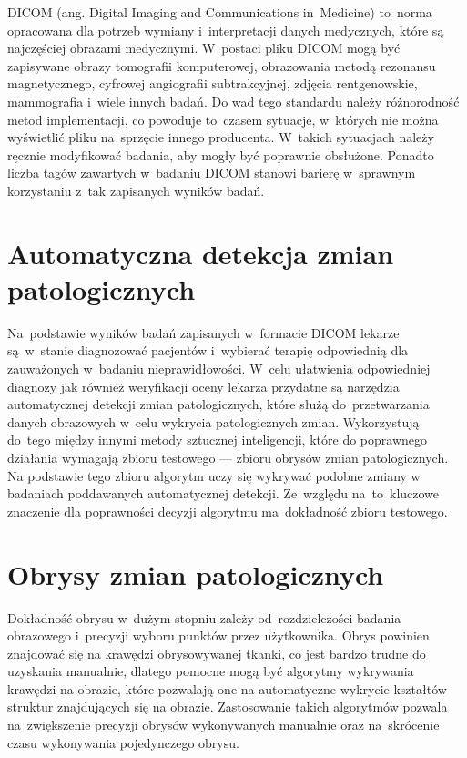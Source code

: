 \documentclass[a4paper,11pt,twoside,openright]{report}
\theoremstyle{definition}
\begin{document}
DICOM (ang. Digital Imaging and Communications in~Medicine) \cite{DICOM} to~norma
opracowana dla potrzeb wymiany i~interpretacji danych medycznych, które są
najczęściej obrazami medycznymi. W~postaci pliku DICOM mogą być zapisywane obrazy
tomografii komputerowej, obrazowania metodą rezonansu magnetycznego, cyfrowej
angiografii subtrakcyjnej, zdjęcia rentgenowskie, mammografia i~wiele innych badań.
Do wad tego standardu należy różnorodność metod implementacji, co powoduje to~czasem
sytuacje, w~których nie można wyświetlić pliku na~sprzęcie innego producenta.
W~takich sytuacjach należy ręcznie
modyfikować badania, aby mogły być poprawnie obsłużone. Ponadto liczba tagów zawartych w~badaniu
DICOM stanowi barierę w~sprawnym korzystaniu z~tak zapisanych wyników badań.

\section {Automatyczna detekcja zmian patologicznych}

Na~podstawie wyników badań zapisanych w~formacie DICOM lekarze są~w~stanie diagnozować
pacjentów i~wybierać terapię odpowiednią dla zauważonych w~badaniu nieprawidłowości.
W~celu ułatwienia odpowiedniej diagnozy jak również weryfikacji oceny lekarza
przydatne są narzędzia automatycznej detekcji zmian patologicznych,
które służą do~przetwarzania danych obrazowych w~celu
wykrycia patologicznych zmian. Wykorzystują do~tego między innymi metody sztucznej
inteligencji, które do poprawnego działania wymagają zbioru testowego --- zbioru
obrysów zmian patologicznych. Na podstawie tego zbioru algorytm uczy się
wykrywać podobne zmiany w badaniach poddawanych automatycznej detekcji.
Ze~względu na~to~kluczowe znaczenie dla poprawności decyzji algorytmu ma~dokładność zbioru testowego.

\section {Obrysy zmian patologicznych}

Dokładność obrysu w~dużym stopniu zależy od~rozdzielczości badania obrazowego i~precyzji
wyboru punktów przez użytkownika. Obrys powinien znajdować się na krawędzi
obrysowywanej tkanki, co jest bardzo trudne do uzyskania manualnie,
dlatego pomocne mogą być algorytmy wykrywania krawędzi na obrazie, które pozwalają one na automatyczne
wykrycie kształtów struktur znajdujących się na obrazie. Zastosowanie takich algorytmów
pozwala na~zwiększenie precyzji obrysów wykonywanych manualnie oraz na~skrócenie
czasu wykonywania pojedynczego obrysu.
\end{document}
